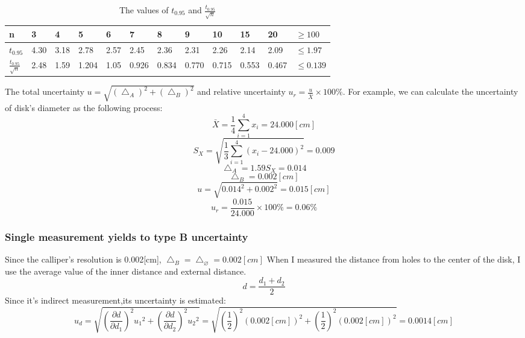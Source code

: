 \documentclass[12pt]{article}
\begin{document}
\begin{table}[H]
\centering
\begin{tabular}{|l|l|l|l|l|l|l|l|l|l|l|l|}
\hline
n                         & 3    & 4    & 5     & 6    & 7     & 8     & 9     & 10    & 15    & 20    & $\ge100$   \\ \hline
$t_0.95$                  & 4.30 & 3.18 & 2.78  & 2.57 & 2.45  & 2.36  & 2.31  & 2.26  & 2.14  & 2.09  & $\le1.97$  \\ \hline
$\frac{t_0.95}{\sqrt{n}}$ & 2.48 & 1.59 & 1.204 & 1.05 & 0.926 & 0.834 & 0.770 & 0.715 & 0.553 & 0.467 & $\le0.139$ \\ \hline
\end{tabular}
\caption{The values of $t_{0.95}$ and $\frac{t_{0.95}}{\sqrt{n}}$}
\end{table}


\par The total uncertainty $u=\sqrt{(\bigtriangleup_A)^2+(\bigtriangleup_B)^2}$ and relative uncertainty $u_r=\frac{u}{\bar{X}}\times100\%$. For example, we can calculate the uncertainty of disk's diameter as the following process:
$$\bar{X}=\frac{1}{4}\sum_{i=1}^4x_i=24.000[cm]$$
$$S_X=\sqrt{\frac{1}{3}\sum_{i=1}^4(x_i-24.000)^2}=0.009$$   
$$\bigtriangleup_A=1.59{S_X}=0.014$$
$$\bigtriangleup_B=0.002[cm]$$
$$u=\sqrt{{0.014}^2+{0.002}^2}=0.015[cm]$$
$$u_r=\frac{0.015}{24.000}\times100\%=0.06\%$$
\subsubsection{Single measurement yields to type B uncertainty}
Since the calliper's resolution is 0.002[cm], $\bigtriangleup_B=\bigtriangleup_\varnothing=0.002[cm]$
When I measured the distance from holes to the center of the disk, I use the average value of the inner distance and external distance.
\begin{equation}
d=\frac{d_1+d_2}{2}
\end{equation} 
Since it's indirect measurement,its uncertainty is estimated:
$$u_d=\sqrt{(\frac{\partial{d}}{\partial{d_1}})^2{u_1}^2+(\frac{\partial{d}}{\partial{d_2}})^2{u_2}^2}=\sqrt{(\frac{1}{2})^2{(0.002[cm])}^2+(\frac{1}{2})^2{(0.002[cm])}^2}=0.0014[cm]$$
\end{document}
